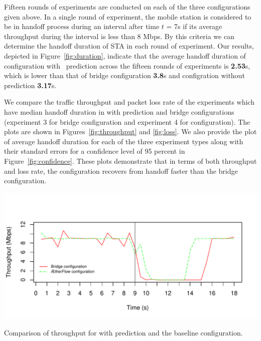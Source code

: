 Fifteen rounds of experiments are conducted on each of the three configurations given
above. In a single round of experiment, the mobile station is considered to be
in handoff process during an interval after time $t$ = 7s if its average
throughput during the interval is less than 8 Mbps. By this criteria we can
determine the handoff duration of STA in each round of experiment. Our results, depicted  in Figure~\ref{fig:duration}, indicate that the average handoff
duration of \aetherflow configuration with ~prediction across the fifteen rounds of experiments is
\textbf{2.53}s, which is lower than that of bridge configuration \textbf{3.8}s and \aetherflow configration without prediction \textbf{3.17}s.

We compare the traffic throughput and packet loss rate of the experiments
which have median handoff duration in \aetherflow with prediction and bridge configurations (experiment 3 for
bridge configuration and experiment 4 for \aetherflow configuration). 
The plots are shown in Figures~\ref{fig:throughput} and \ref{fig:loss}. We also provide the plot of average handoff duration for each of the three experiment types along with their standard errors for a confidence level of 95 percent in Figure~\ref{fig:confidence}.
These plots demonstrate that in terms of both throughput and loss rate, the \aetherflow
configuration recovers from handoff faster than the bridge configuration. 

\begin{table}
\centering
\includegraphics[width=.8\textwidth]{figures/throughput}
\caption{Comparison of throughput for \aetherflow with prediction and the baseline configuration.} %
\label{fig:throughput}
\end{table}


